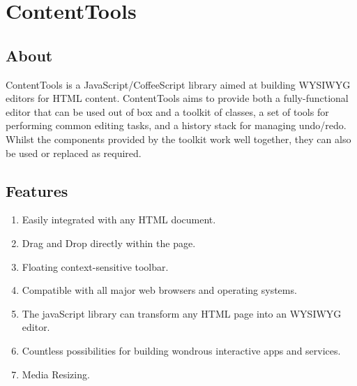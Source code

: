 \section{ContentTools}
\subsection{About}
ContentTools is a JavaScript/CoffeeScript library aimed at building WYSIWYG editors for
HTML content. ContentTools aims to provide both a fully-functional editor that can be used
out of box and a toolkit of classes, a set of tools for performing common editing tasks, and a
history stack for managing undo/redo. Whilst the components provided by the toolkit work
well together, they can also be used or replaced as required. \newline
\subsection{Features}
\begin{enumerate}
\item Easily integrated with any HTML document.
\item Drag and Drop directly within the page.
\item Floating context-sensitive toolbar.
\item Compatible with all major web browsers and operating systems.
\item The javaScript library can transform any HTML page into an WYSIWYG editor.
\item Countless possibilities for building wondrous interactive apps and services.
\item Media Resizing.
\end{enumerate}
